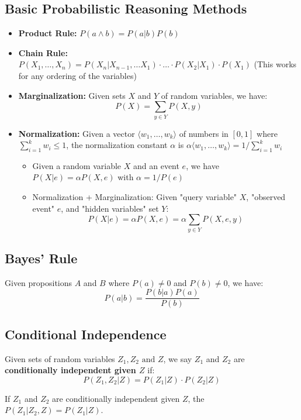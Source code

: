 \documentclass{scrartcl}
\begin{document}
\subsection{Basic Probabilistic Reasoning Methods}
\begin{itemize}
    \item
        \textbf{Product Rule:} \(P(a \land b) = P(a | b) P(b)\) 
    \item
        \textbf{Chain Rule:} \(P(X_1, \dots, X_n) = P(X_n | X_{n-1}, \dots X_1) \cdot \dots \cdot P(X_2 | X_1) \cdot P(X_1)\) (This works for any ordering of the variables)
    \item
        \textbf{Marginalization:} Given sets \(X\) and \(Y\) of random variables, we have:
        \[P(X) = \sum_{y \in Y} P(X, y)\]
    \item
        \textbf{Normalization:} Given a vector \(\langle w_1, \dots, w_k \rangle\) of numbers in \([0,1]\) where \(\sum_{i=1}^k w_i \leq 1\), the normalization constant \(\alpha\) is \(\alpha \langle w_1, \dots, w_k \rangle = 1/\sum_{i=1}^k w_i\)
        \begin{itemize}
            \item
                Given a random variable \(X\) and an event \(e\), we have \(P(X|e) = \alpha P(X, e)\) with \(\alpha = 1/P(e)\)
            \item
                Normalization + Marginalization: Given "query variable" \(X\), "observed event" \(e\), and "hidden variables" set \(Y\):
                \[P(X|e) = \alpha P(X, e) = \alpha \sum_{y \in Y} P(X, e, y)\]
        \end{itemize}
\end{itemize}

\subsection{Bayes' Rule}
Given propositions \(A\) and \(B\) where \(P(a) \neq 0\) and  \(P(b) \neq 0\), we have:
\[P(a|b) = \frac{P(b|a) P(a)}{P(b)}\]

\subsection{Conditional Independence}
Given sets of random variables \(Z_1, Z_2 \text{ and } Z\), we say \(Z_1\) and \(Z_2\) are \textbf{conditionally independent given \(Z\)} if:
\[P(Z_1, Z_2 | Z) = P(Z_1 | Z) \cdot P(Z_2 | Z)\]

If \(Z_1\) and \(Z_2\) are conditionally independent given \(Z\), the \(P(Z_1 | Z_2, Z) = P(Z_1 | Z)\).
\end{document}

